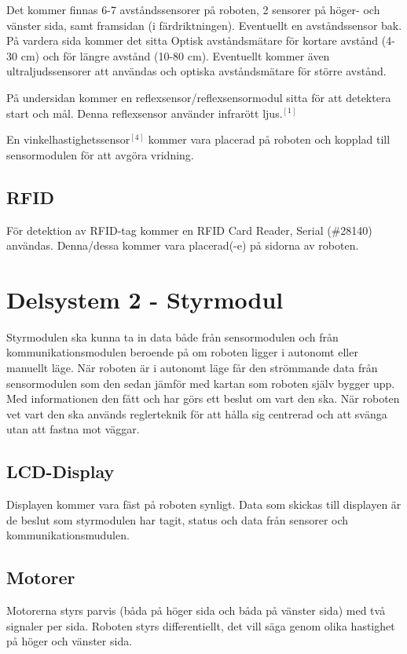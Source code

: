 \documentclass[11pt]{article}
\begin{document}
\begin{flushleft}
Det kommer finnas 6-7 avståndssensorer på roboten, 2 sensorer på höger- och vänster sida, samt framsidan (i färdriktningen). Eventuellt en avståndssensor bak. På vardera sida kommer det sitta Optisk avståndsmätare för kortare avstånd (4-30 cm) och för längre avstånd (10-80 cm). Eventuellt kommer även ultraljudssensorer att användas och optiska avståndsmätare för större avstånd. 

\bigskip

På undersidan kommer en reflexsensor/reflexsensormodul sitta för att detektera start och mål. Denna reflexsensor använder infrarött ljus.$^{[1]}$ 

\bigskip

En vinkelhastighetssensor$ ^{[4]} $ kommer vara placerad på roboten och kopplad till sensormodulen för att avgöra vridning.

\subsection{RFID}
För detektion av RFID-tag kommer en RFID Card Reader, Serial (\#28140) användas. Denna/dessa kommer vara placerad(-e) på sidorna av roboten.

\section{Delsystem 2 - Styrmodul}
Styrmodulen ska kunna ta in data både från sensormodulen och från kommunikationsmodulen beroende på om roboten ligger i autonomt eller manuellt läge. När roboten är i autonomt läge får den strömmande data från sensormodulen som den sedan jämför med kartan som roboten själv bygger upp. Med informationen den fått och har görs ett beslut om vart den ska. När roboten vet vart den ska används reglerteknik för att hålla sig centrerad och att svänga utan att fastna mot väggar.    


\subsection{LCD-Display}
Displayen kommer vara fäst på roboten synligt. Data som skickas till displayen är de beslut som styrmodulen har tagit, status och data från sensorer och kommunikationsmudulen.

\subsection{Motorer}
Motorerna styrs parvis (båda på höger sida och båda på vänster sida) med två signaler per sida. Roboten styrs differentiellt, det vill säga genom olika hastighet på höger och vänster sida. 


\end{flushleft}
\end{document}

